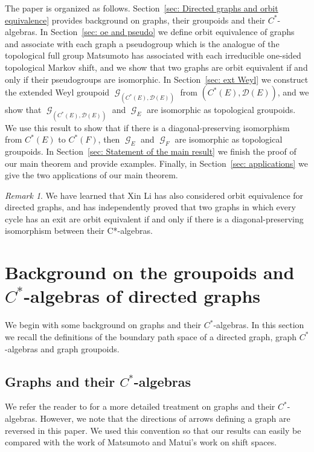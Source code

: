 \documentclass[12pt, a4paper]{amsart}
\numberwithin{equation}{section}
\theoremstyle{definition}
\theoremstyle{remark}
\newtheorem{remark}[thm]{Remark}
\begin{document}
The paper is organized as follows. Section~\ref{sec: Directed graphs and orbit 
equivalence} provides background on graphs, their groupoids and their 
$C^*$-algebras. In Section~\ref{sec: oe and pseudo} we define orbit 
equivalence of graphs and associate with each graph a pseudogroup which is the analogue of the topological full group Matsumoto has associated with each irreducible one-sided topological Markov shift, and we show that two graphs are orbit 
equivalent if and only if their pseudogroups are isomorphic. In 
Section~\ref{sec: ext Weyl} we construct the extended Weyl groupoid 
${\operatorname{\mathcal{G}}}_{(C^*(E),{\mathcal{D}}(E))}$ from $(C^*(E),{\mathcal{D}}(E))$, and we show that 
${\operatorname{\mathcal{G}}}_{(C^*(E),{\mathcal{D}}(E))}$ and ${\operatorname{\mathcal{G}}}_E$ are isomorphic as topological groupoids. 
We use this result to show that if there is 
a diagonal-preserving isomorphism from $C^*(E)$ to $C^*(F)$, then ${\operatorname{\mathcal{G}}}_E$ and 
${\operatorname{\mathcal{G}}}_F$ are isomorphic as topological 
groupoids. In Section~\ref{sec: Statement of the main result} we finish the proof of our main 
theorem and 
provide examples. Finally, in Section~\ref{sec: applications} we give the two 
applications of our main theorem.

\begin{remark}
We have learned that Xin Li has also considered orbit equivalence for directed graphs, and has independently proved that two graphs in which every cycle has an exit are orbit equivalent if and only if there is a diagonal-preserving isomorphism between their C*-algebras.
\end{remark}

\section{Background on the groupoids and $C^*$-algebras of directed 
graphs}\label{sec: Directed graphs and orbit equivalence}

We begin with some background on graphs and their $C^*$-algebras. In this section we recall the definitions of the boundary path space of a directed graph, graph $C^*$-algebras and graph groupoids. 

\subsection{Graphs and their $C^*$-algebras}
We refer the reader to \cite{Raeburn2005} for a more detailed treatment on graphs and their $C^*$-algebras. However, we note that the directions of arrows defining a graph are reversed in this paper. We used this convention so that our results can easily be compared with the work of Matsumoto and Matui's work on shift spaces.
\end{document}
